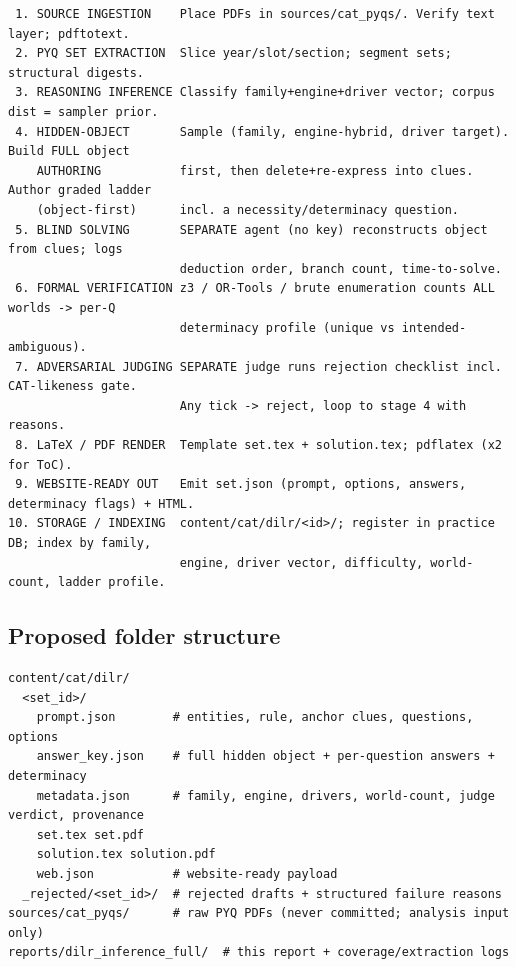 \documentclass[11pt,a4paper]{article}
\begin{document}
\begin{small}
\begin{verbatim}
 1. SOURCE INGESTION    Place PDFs in sources/cat_pyqs/. Verify text layer; pdftotext.
 2. PYQ SET EXTRACTION  Slice year/slot/section; segment sets; structural digests.
 3. REASONING INFERENCE Classify family+engine+driver vector; corpus dist = sampler prior.
 4. HIDDEN-OBJECT       Sample (family, engine-hybrid, driver target). Build FULL object
    AUTHORING           first, then delete+re-express into clues. Author graded ladder
    (object-first)      incl. a necessity/determinacy question.
 5. BLIND SOLVING       SEPARATE agent (no key) reconstructs object from clues; logs
                        deduction order, branch count, time-to-solve.
 6. FORMAL VERIFICATION z3 / OR-Tools / brute enumeration counts ALL worlds -> per-Q
                        determinacy profile (unique vs intended-ambiguous).
 7. ADVERSARIAL JUDGING SEPARATE judge runs rejection checklist incl. CAT-likeness gate.
                        Any tick -> reject, loop to stage 4 with reasons.
 8. LaTeX / PDF RENDER  Template set.tex + solution.tex; pdflatex (x2 for ToC).
 9. WEBSITE-READY OUT   Emit set.json (prompt, options, answers, determinacy flags) + HTML.
10. STORAGE / INDEXING  content/cat/dilr/<id>/; register in practice DB; index by family,
                        engine, driver vector, difficulty, world-count, ladder profile.
\end{verbatim}
\end{small}

\subsection{Proposed folder structure}
\begin{small}
\begin{verbatim}
content/cat/dilr/
  <set_id>/
    prompt.json        # entities, rule, anchor clues, questions, options
    answer_key.json    # full hidden object + per-question answers + determinacy
    metadata.json      # family, engine, drivers, world-count, judge verdict, provenance
    set.tex set.pdf
    solution.tex solution.pdf
    web.json           # website-ready payload
  _rejected/<set_id>/  # rejected drafts + structured failure reasons
sources/cat_pyqs/      # raw PYQ PDFs (never committed; analysis input only)
reports/dilr_inference_full/  # this report + coverage/extraction logs
\end{verbatim}
\end{small}
\end{document}
